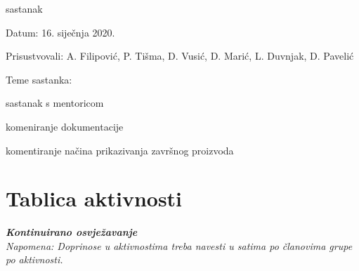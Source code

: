 \begin{packed_enum}
	\item  sastanak
\item[] \begin{packed_item}
	\item Datum: 16. siječnja 2020.
	\item Prisustvovali: A. Filipović, P. Tišma, D. Vusić, D. Marić, L. Duvnjak, D. Pavelić
	\item Teme sastanka:
	\begin{packed_item}
		\item  sastanak s mentoricom
		\item  komeniranje dokumentacije
		\item  komentiranje načina prikazivanja završnog proizvoda
	\end{packed_item}
\end{packed_item}
			
			
		\end{packed_enum}
		
		\eject
		\section*{Tablica aktivnosti}
		
			\textbf{\textit{Kontinuirano osvježavanje}}\\
			
			 \textit{Napomena: Doprinose u aktivnostima treba navesti u satima po članovima grupe po aktivnosti.}
					
						
			
